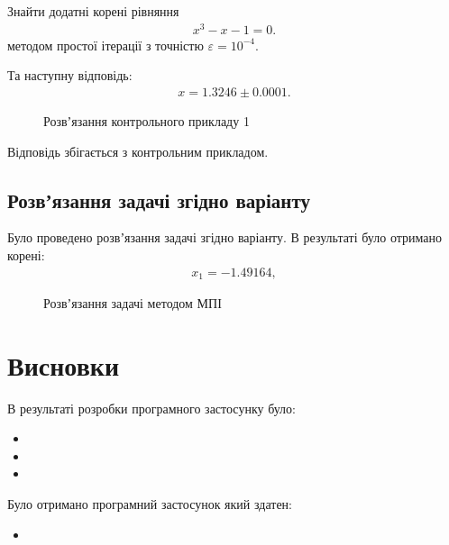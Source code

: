 \documentclass[\mainDocument]{subfiles}
\begin{document}
	Знайти додатні корені рівняння 
	\begin{gather}
		x^3-x-1=0.
	\end{gather}
	методом простої ітерації з точністю \(\varepsilon = 10^{-4}\). 

	Та наступну відповідь:
	\begin{gather}
		x = 1.3246\pm0.0001. 
	\end{gather}

	\begin{figure}[!h]
		\begin{center}
		\end{center}
		\caption{Розвʼязання контрольного прикладу 1}\label{fig:test01}
	\end{figure}
	Відповідь збігається з контрольним прикладом.

	\section{Розвʼязання задачі згідно варіанту}
	Було проведено розвʼязання задачі згідно варіанту. В результаті було отримано корені:
	\begin{gather}
		x_1=-1.49164,
	\end{gather}
	\begin{figure}[!h]
		\begin{center}
		\end{center}
		\caption{Розвʼязання задачі методом МПІ}\label{fig:test1}
	\end{figure}

	\FloatBarrier
	\newpage
	\chapter{Висновки}
	В результаті розробки програмного застосунку було:
	\begin{itemize}
		\item
		\item
		\item
	\end{itemize}
	Було отримано програмний застосунок який здатен:
	\begin{itemize}
		\item 
	\end{itemize}
\end{document}
